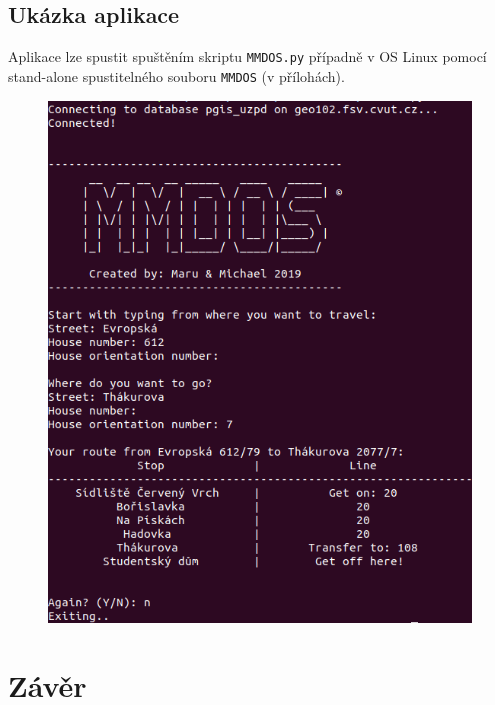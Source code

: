 \documentclass[a4paper, 12pt]{article}
\begin{document}
\subsection{Ukázka aplikace}
Aplikace lze spustit spuštěním skriptu \texttt{MMDOS.py} případně v OS Linux pomocí stand-alone spustitelného souboru \texttt{MMDOS} (v přílohách).
\begin{figure}[h!]
 \centering
 \includegraphics[scale=0.5]{ukazka.png}
\end{figure}


\newpage
\section{Závěr}
\end{document}
